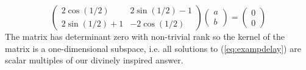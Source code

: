 	\[
		\begin{pmatrix}
			2 \cos(1/2) 	& 2 \sin(1/2) - 1 \\
			2 \sin(1/2) + 1	& - 2 \cos(1/2)
		\end{pmatrix}
		\begin{pmatrix}
			a \\
			b
		\end{pmatrix}
		= 
		\begin{pmatrix}
			0 \\
			0
		\end{pmatrix}
	\]
The matrix has determinant zero with non-trivial rank so the kernel of the matrix is a one-dimensional subspace, i.e. all solutions to (\ref{eq:exampdelay}) are scalar multiples of our divinely inspired answer. 
	